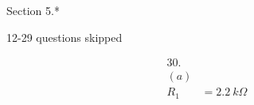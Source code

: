 \documentclass[openany]{book}
\begin{document}
\frontmatter
\tableofcontents
\clearpage

\mainmatter

\raggedright

Section 5.*

12-29 questions skipped

\begin{multicol}{2}
\begin{align*}
    30. \\ (a) \\ R_1 &= 2.2\ k \Omega
\end{align*}
\end{multicol}
\end{document}
